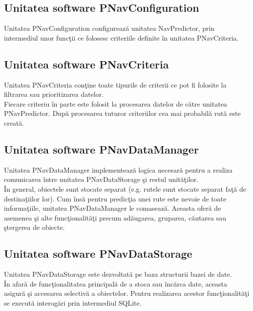 \subsection{Unitatea software PNavConfiguration} 
Unitatea PNavConfiguration configurează unitatea NavPredictor, prin intermediul unor funcţii ce folosesc criteriile definite în unitatea PNavCriteria.


\subsection{Unitatea software PNavCriteria} 
Unitatea PNavCriteria conţine toate tipurile de criterii ce pot fi folosite la filtrarea sau prioritizarea datelor.
\vspace{6pt}
\\Fiecare criteriu în parte este folosit la procesarea datelor de către unitatea PNavPredictor.
După procesarea tuturor criteriilor cea mai probabilă rută este creată.


\subsection{Unitatea software PNavDataManager} 
Unitatea PNavDataManager implementează logica necesară pentru a realiza comunicarea între unitatea PNavDataStorage şi restul unităţilor.
\vspace{6pt}
\\În general, obiectele sunt stocate separat (e.g. rutele sunt stocate separat faţă de destinaţiilor lor). Cum însă pentru predicţia unei rute este nevoie de toate informaţiile, unitatea PNavDataManager le comasează. Aceasta oferă de asemenea şi alte funcţionalităţi precum adăugarea, gruparea, căutarea sau ştergerea de obiecte.


\subsection{Unitatea software PNavDataStorage} 
Unitatea PNavDataStorage este dezvoltată pe baza structurii bazei de date.
\vspace{6pt}
\\În afară de funcţionalitatea principală de a stoca sau încărca date, aceasta asigură şi accesarea selectivă a obiectelor. Pentru realizarea acestor funcţionalităţi se execută interogări prin intermediul SQLite.
